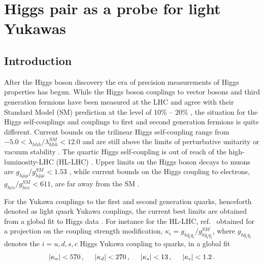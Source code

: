 
\chapter{ Higgs pair as a probe for light Yukawas }\label{chap:lightyuk}

\section{Introduction}
After the Higgs boson discovery the era of precision measurements of Higgs properties has begun. While the Higgs boson couplings to vector bosons and third generation fermions have been measured at the LHC and agree with their Standard Model (SM) prediction at the level of 10\% -- 20\% \cite{Aad:2019mbh}, the situation for the Higgs self-couplings and couplings to first and second generation fermions is quite different.
Current bounds on the trilinear Higgs self-coupling  range from $-5.0< \lambda_{hhh}/\lambda_{hhh}^{SM}< 12.0 $  \cite{Aad:2019uzh} and are still above the limits of perturbative unitarity \cite{DiLuzio:2017tfn} or vacuum stability \cite{Falkowski:2019tft}. The quartic Higgs self-coupling is out of reach of the high-luminosity-LHC (HL-LHC) \cite{Plehn:2005nk, Binoth:2006ym}.
Upper limits on the Higgs boson decays to muons are $g_{h\bar{\mu}\mu}/g_{h\bar{\mu}\mu}^{SM}< 1.53$ \cite{Aad:2019mbh}, while current bounds on the Higgs coupling to electrons, $g_{h\bar{e}e}/g_{h\bar{e}e}^{SM}< 611$, are far away from the SM \cite{Khachatryan:2014aep}.
\par
For the Yukawa couplings to the first and second generation quarks, henceforth denoted as light quark Yukawa couplings, the current best limits are obtained from a global fit to Higgs data \cite{Kagan:2014ila, Perez:2015aoa}.  For instance for the HL-LHC, ref.~\cite{deBlas:2019rxi} obtained for a projection on the coupling strength modification, $\kappa_i=g_{h\bar{q}_iq_i}/g_{h\bar{q}_iq_i}^{SM}$, where $g_{h\bar{q}_iq_i}$ denotes the $i=u,d,s,c$ Higgs Yukawa coupling to quarks, in a global fit
\begin{equation}
	|\kappa_u|< 570\,, \hspace*{0.5cm} |\kappa_d|< 270\,, \hspace*{0.5cm}|\kappa_s|< 13\,, \hspace*{0.5cm} |\kappa_c |< 1.2\,. \label{eq:fitbounds1}
\end{equation}
